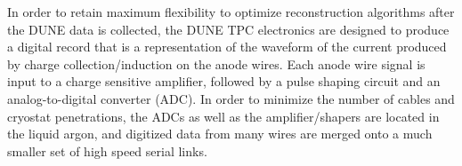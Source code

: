 In order to retain maximum flexibility to optimize reconstruction algorithms after the DUNE data is collected, the DUNE TPC electronics are designed to produce a digital record that is a representation of the waveform of the current produced by charge collection/induction on the anode wires.  Each anode wire signal is input to a charge sensitive amplifier, followed by a pulse shaping circuit and an analog-to-digital converter (ADC).  In order to minimize the number of cables and cryostat penetrations, the ADCs as well as the amplifier/shapers are located in the liquid argon, and digitized data from many wires are merged onto a much smaller set of high speed serial links.  %

